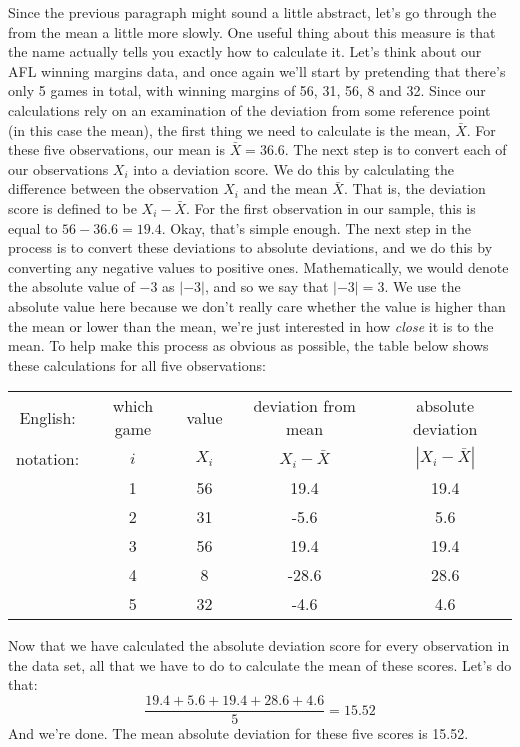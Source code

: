 Since the previous paragraph might sound a little abstract, let's go through the  from the mean a little more slowly. One useful thing about this measure is that the name actually tells you exactly how to calculate it. Let's think about our AFL winning margins data, and once again we'll start by pretending that there's only 5 games in total, with winning margins of 56, 31, 56, 8 and 32. Since our calculations rely on an examination of the deviation from some reference point (in this case the mean), the first thing we need to calculate is the mean, $\bar{X}$. For these five observations, our mean is $\bar{X} = 36.6$. The next step is to convert each of our observations $X_i$ into a deviation score. We do this by calculating the difference between the observation $X_i$ and the mean $\bar{X}$. That is, the deviation score is defined to be $X_i - \bar{X}$. For the first observation in our sample, this is equal to $56 - 36.6 = 19.4$. Okay, that's simple enough. The next step in the process is to convert these deviations to absolute deviations, and we do this by converting any negative values to positive ones. Mathematically, we would denote the absolute value of $-3$ as $|-3|$, and so we say that $|-3| = 3$. We use the absolute value here because we don't really care whether the value is higher than the mean or lower than the mean, we're just interested in how {\it close} it is to the mean. To help make this process as obvious as possible, the table below shows these calculations for all five observations:\\

\begin{center}
\begin{tabular}{ccccc} 
English: & which game & value & deviation from mean & absolute deviation \\
notation: & $i$ & $X_i$ & $X_i - \bar{X}$ &  $|X_i - \bar{X}|$ \\ \hline
& 1 & 56 & 19.4  & 19.4\\
& 2 & 31 &  -5.6 & 5.6\\ 
& 3 & 56 & 19.4  & 19.4\\
& 4 & 8 & -28.6  & 28.6\\
& 5 & 32 & -4.6  & 4.6 \\
\end{tabular}
\end{center}

\noindent
Now that we have calculated the absolute deviation score for every observation in the data set, all that we have to do to calculate the mean of these scores. Let's do that:\\
$$
\frac{19.4 + 5.6 + 19.4 + 28.6 + 4.6}{5} = 15.52
$$
And we're done. The mean absolute deviation for these five scores is 15.52. 


